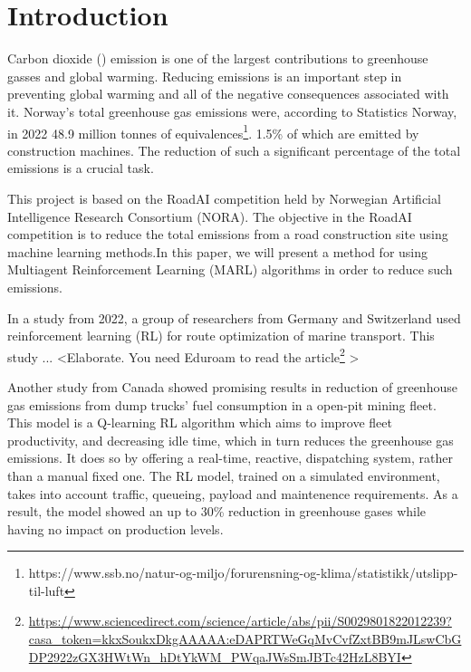 \documentclass[conference]{IEEEtran}
\begin{document}
  \section{Introduction}
  Carbon dioxide (\coo{}) emission is one of the largest contributions to greenhouse gasses and global warming.
  Reducing \coo{} emissions is an important step in preventing global warming and all of the negative
  consequences associated with it. Norway's total greenhouse gas emissions were, according to Statistics
  Norway, in 2022 48.9 million tonnes of \coo{}
  equivalences\footnote{https://www.ssb.no/natur-og-miljo/forurensning-og-klima/statistikk/utslipp-til-luft}.
  1.5\% of which are emitted by construction machines. \cite{noraRoadAIReducing} The reduction of such
  a significant percentage of the total emissions is a crucial task.

  This project is based on the RoadAI competition held by Norwegian Artificial Intelligence Research
  Consortium (NORA). \cite{noraRoadAIReducing} The objective in the RoadAI competition is to reduce the
  total \coo{} emissions from a road construction site using machine learning methods.In this paper, we will
  present a method for using Multiagent Reinforcement Learning (MARL) algorithms in order to reduce such
  emissions.

  In a study from 2022, a group of researchers from Germany and Switzerland used reinforcement learning
  (RL) for route optimization of marine transport. \cite{MORADI2022111882} This study ... \textless Elaborate. You need
  Eduroam to read the article\footnote{\url{https://www.sciencedirect.com/science/article/abs/pii/S0029801822012239?casa_token=kkxSoukxDkgAAAAA:eDAPRTWeGqMvCvfZxtBB9mJLswCbGDP2922zGX3HWtWn_hDtYkWM_PWqaJWsSmJBTc42HzL8BYI}} \textgreater

  Another study from Canada \cite{HUO2023106664} showed promising results in reduction of greenhouse gas
  emissions
  from dump trucks' fuel consumption in a open-pit mining fleet. This model is a Q-learning RL algorithm
  which aims to improve fleet productivity, and decreasing idle time, which in turn reduces the greenhouse
  gas emissions. It does so by offering a real-time, reactive,  dispatching system, rather than a manual
  fixed one. The RL model, trained on a simulated environment, takes into account traffic, queueing,
  payload and maintenence requirements. As a result, the model showed an up to 30\% reduction in greenhouse
  gases while having no impact on production levels.
\end{document}
